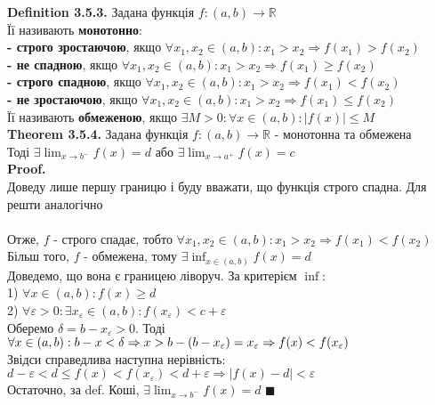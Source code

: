 \documentclass[a4paper, 14pt]{extarticle}
\def\huge{\displaystyle}
\def\bigline{\vspace{5mm}\\}
\def\defin#1{\textbf{Definition {#1}}}
\def\th#1{\textbf{Theorem {#1}}}
\def\proof{\textbf{Proof.}\\}
\def\bigline{\vspace{5mm}\\}
\def\qed{$\blacksquare$}
\begin{document}
\defin{3.5.3.} Задана функція $f: (a,b) \to \mathbb{R}$\\
Її називають \textbf{монотонно}:\\
\textbf{- строго зростаючою}, якщо $\forall x_1,x_2 \in (a,b): x_1 > x_2 \Rightarrow f(x_1)>f(x_2)$\\
\textbf{- не спадною}, якщо $\forall x_1,x_2 \in (a,b): x_1 > x_2 \Rightarrow f(x_1) \geq f(x_2)$\\
\textbf{- строго спадною}, якщо $\forall x_1,x_2 \in (a,b): x_1 > x_2 \Rightarrow f(x_1) < f(x_2)$\\
\textbf{- не зростаючою}, якщо $\forall x_1,x_2 \in (a,b): x_1 > x_2 \Rightarrow f(x_1) \leq f(x_2)$
\bigline
Її називають \textbf{обмеженою}, якщо $\exists M>0: \forall x \in (a,b): |f(x)| \leq M$
\bigline
\th{3.5.4.} Задана функція $f: (a,b) \to \mathbb{R}$ - монотонна та обмежена\\
Тоді $\huge \exists \lim_{x \to b^-} f(x) = d$ або $\huge \exists \lim_{x \to a^+} f(x) = c$\\
\proof
Доведу лише першу границю і буду вважати, що функція строго спадна. Для решти аналогічно\\
\\
Отже, $f$ - строго спадає, тобто $\forall x_1,x_2 \in (a,b): x_1>x_2 \Rightarrow f(x_1)<f(x_2)$\\
Більш того, $f$ - обмежена, тому $\exists \huge \inf_{x \in (a,b)} f(x) = d$\\
Доведемо, що вона є границею ліворуч. За критерієм $\inf$:\\
1) $\forall x \in (a,b): f(x) \geq d$\\
2) $\forall \varepsilon > 0: \exists x_{\varepsilon} \in (a,b): f(x_{\varepsilon})<c + \varepsilon$\\
Оберемо $\delta = b - x_{\varepsilon} > 0$. Тоді $\forall x \in (a,b): b-x<\delta \Rightarrow \\ x > b - (b-x_{\varepsilon}) = x_{\varepsilon} \Rightarrow f(x) < f(x_\varepsilon)$\\
Звідси справедлива наступна нерівність:\\
$d - \varepsilon < d \leq f(x) < f(x_\varepsilon) < d + \varepsilon \Rightarrow |f(x)-d| < \varepsilon$\\
Остаточно, за def. Коші, $\exists \huge \lim_{x \to b^-} f(x) =  d$ \qed
\bigline
\end{document}
